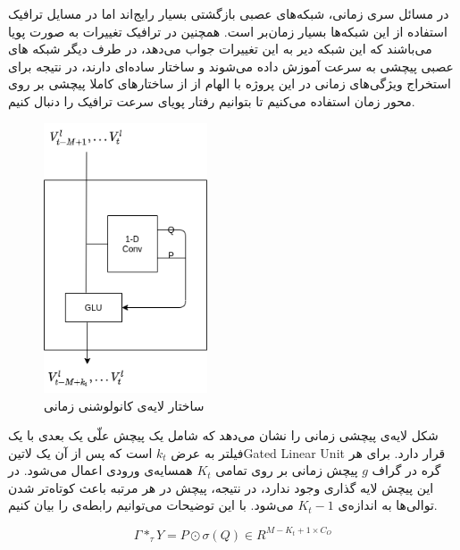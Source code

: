 در مسائل سری زمانی، شبکه‌های عصبی بازگشتی بسیار رایج‌اند اما در مسایل ترافیک استفاده از این شبکه‌ها بسیار زمان‌بر است.
همچنین در ترافیک تغییرات به صورت پویا می‌باشند که این شبکه دیر به این تغییرات جواب می‌دهد،
در طرف دیگر شبکه های عصبی پیچشی به سرعت آموزش داده می‌شوند و ساختار ساده‌ای دارند، در نتیجه برای استخراج ویژگی‌های زمانی در این پروژه با الهام از
 از ساختارهای کاملا پیچشی بر روی محور زمان استفاده می‌کنیم تا بتوانیم رفتار پویای سرعت ترافیک را دنبال کنیم.

\begin{figure}
  \includegraphics[height=8cm]{./images/time-conv.png}
  \centering
  \caption{
ساختار لایه‌ی کانولوشنی زمانی 
  }
  \label{fig:time-conv}
\end{figure}

شکل  لایه‌ی پیچشی زمانی را نشان می‌دهد که شامل یک پیچش علّی یک بعدی
با یک فیلتر به عرض  $k_{t}$ است که پس از آن یک ‌لاتین{Gated Linear Unit} قرار دارد.
برای هر گره در گراف $g$ پیچش زمانی بر روی تمامی $K_{t}$ همسایه‌ی ورودی اعمال می‌شود.
در این پیچش لایه گذاری وجود ندارد‌‌، در نتیجه، پیچش در هر مرتبه باعث کوتاه‌تر شدن توالی‌ها به اندازه‌ی $K_{t}-1$ می‌شود.
با این توضیحات می‌توانیم رابطه‌ی  را بیان کنیم.

\begin{equation}
  \Gamma *_{\tau} Y = P \odot \sigma (Q) \in R^{M-K_{t}+1 \times C_{O}}
  \label{eq:time-conv}
\end{equation}

